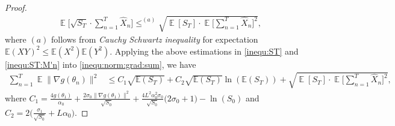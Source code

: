 \documentclass[standalone]{article}
\newcommand{\E}{\mathbb{E}}
\DeclareMathOperator{\Expect}{\mathbb{E}}
\begin{document}
\begin{proof}
\begin{align}
& \Expect\bigg[\sqrt{S_{T}}\cdot\sum_{n=1}^{T}\hat{X}_{n}\bigg] \mathop{\leq}^{(a)}   \sqrt{\Expect[S_{T}]\cdot\Expect\bigg[\sum_{n=1}^{T}\hat{X}_{n}\bigg]^{2}},\label{inequ:ST:M'n}
\end{align}
where $(a)$ follows from  \emph{Cauchy Schwartz inequality} for expectation $\E(XY)^2 \leq \E(X^2)\E(Y^2)$. Applying the above estimations in \cref{inequ:ST} and \cref{inequ:ST:M'n} into \cref{inequ:norm:grad:sum}, we have
\begin{equation}\label{zxc_t54}\begin{aligned}
\sum_{n=1}^{T}\Expect\|\nabla g(\theta_{n})\|^{2}&\le C_1 \sqrt{\E\left(S_T \right)} + C_2\sqrt{\E\left(S_T \right)} \ln(\E(S_T)) +\sqrt{\Expect[S_{T}]\cdot\Expect\bigg[\sum_{n=1}^{T}\hat{X}_{n}\bigg]^{2}},
\end{aligned}\end{equation}
where $C_1 = \frac{4g(\theta_{1})}{\alpha_0}+\frac{2\sigma_{0}\|\nabla g(\theta_{1})\|^{2}}{\sqrt{S_{0}}}+\frac{4 L^{2}\alpha_{0}^{2}\sigma_{0}}{\sqrt{S_{0}}}\Big(2\sigma_{0}+1\Big) - \ln(S_0)$ and $C_2 = 2\Big(\frac{\sigma_{1}}{\sqrt{S_{0}}}+ L\alpha_{0}\Big)$. 



\end{proof}
\end{document}
